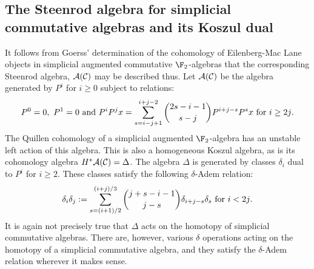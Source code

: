 \documentclass[11pt]{article}
\newcommand{\Palgebra}{\calA(\calC)}
\newcommand{\deltaAlgebra}{\Delta}
\begin{document}
\begin{SteenrodAlgebrasAndTheirKoszulDuals}
\subsection*{The Steenrod algebra for simplicial commutative algebras and its Koszul dual}
It follows from Goerss' determination \cite[p.14]{MR1089001} of the cohomology of Eilenberg-Mac Lane objects in simplicial augmented commutative $\F_2$-algebras that the corresponding Steenrod algebra, $\Palgebra$ may be described thus.
Let $\Palgebra$ be the algebra generated by $P^i$ for $i\geq0$ subject to relations:
\[P^0=0,\ P^1=0\textup{ and }P^iP^jx=\sum_{s=i-j+1}^{i+j-2}{2s-i-1\choose s-j}P^{i+j-s}P^sx\textup{ for $i\geq2j$}.\]
The Quillen cohomology of a simplicial augmented $\F_2$-algebra has an unstable left action of this algebra. This is also a homogeneous Koszul algebra, as is its cohomology algebra $H^*\Palgebra=\deltaAlgebra$. The algebra $\Delta$ is generated by classes $\delta_i$ dual to $P^i$ for $i\geq 2$. These classes satisfy the following $\delta$-Adem relation:
\[\delta_i\delta_j:=\sum_{s=(i+1)/2}^{(i+j)/3}{j+s-i-1\choose j-s}\delta_{i+j-s}\delta_s\textup{ for $i<2j$.}\]
It is again not precisely true that $\deltaAlgebra$ acts on the homotopy of simplicial commutative algebras. There are, however, various $\delta$ operations acting on the homotopy of a simplicial commutative algebra, and they satisfy the $\delta$-Adem relation wherever it makes sense.
\end{SteenrodAlgebrasAndTheirKoszulDuals}
\end{document}
